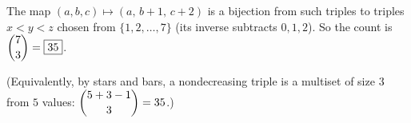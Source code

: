The map $(a,b,c)\mapsto(a,\,b+1,\,c+2)$ is a bijection from such triples to triples $x<y<z$ chosen from $\{1,2,\dots,7\}$ (its inverse subtracts $0,1,2$). So the count is $\dbinom73=\boxed{35}$.

(Equivalently, by stars and bars, a nondecreasing triple is a multiset of size $3$ from $5$ values: $\dbinom{5+3-1}{3}=35$.)
